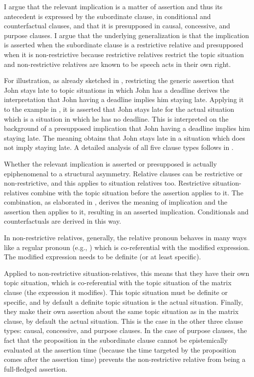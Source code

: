 \documentclass[output=paper,
colorlinks,
citecolor=brown,
newtxmath
]{langscibook}
\begin{document}
I argue that the relevant implication is a matter of assertion and thus its antecedent is expressed by the subordinate clause, in conditional and counterfactual clauses, and that it is presupposed in causal, concessive, and purpose clauses. I argue that the underlying generalization is that the implication is asserted when the subordinate clause is a restrictive relative and presupposed when it is non-restrictive because restrictive relatives restrict the topic situation and non-restrictive relatives are known to be speech acts in their own right.

For illustration, as already sketched in , restricting the generic assertion that John stays late to topic situations in which John has a deadline derives the interpretation that John having a deadline implies him staying late. Applying it to the example in , it is asserted that John stays late for the actual situation which is a situation in which he has no deadline. This is interpreted on the background of a presupposed implication that John having a deadline implies him staying late. The meaning obtains that John stays late in a situation which does not imply staying late. A detailed analysis of all five clause types follows in .

Whether the relevant implication is asserted or presupposed is actually epi\-phenomenal to a structural asymmetry. Relative clauses can be restrictive or non-restrictive, and this applies to situation relatives too. Restrictive situation-relatives combine with the topic situation before the assertion applies to it. The combination, as elaborated in , derives the meaning of implication and the assertion then applies to it, resulting in an asserted implication. Conditionals and counterfactuals are derived in this way.

In non-restrictive relatives, generally, the relative pronoun behaves in many ways like a regular pronoun (e.g., \citealt{Vries2002}) which is co-referential with the modified expression. The modified expression needs to be definite (or at least specific).

Applied to non-restrictive situation-relatives, this means that they have their own topic situation, which is co-referential with the topic situation of the matrix clause (the expression it modifies). This topic situation must be definite or specific, and by default a definite topic situation is the actual situation. Finally, they make their own assertion about the same topic situation as in the matrix clause, by default the actual situation. This is the case in the other three clause types: causal, concessive, and purpose clauses. In the case of purpose clauses, the fact that the proposition in the subordinate clause cannot be epistemically evaluated at the assertion time (because the time targeted by the proposition comes after the assertion time) prevents the non-restrictive relative from being a full-fledged assertion.
\end{document}
